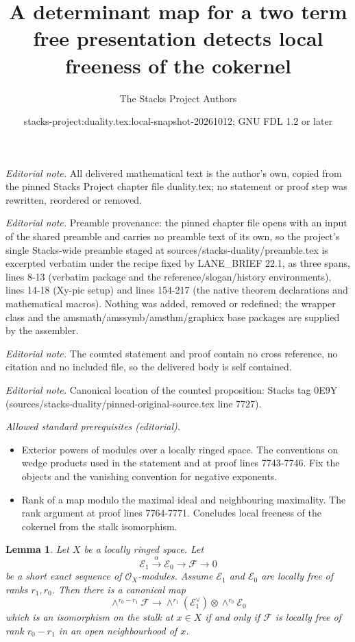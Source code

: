 \documentclass[10pt,a4paper]{amsart}
\title{A determinant map for a two term free presentation detects local freeness of the cokernel}
\author{The Stacks Project Authors}
\date{stacks-project:duality.tex:local-snapshot-20261012; GNU FDL 1.2 or later}
\theoremstyle{plain}
\newtheorem{lemma}[subsection]{Lemma}
\theoremstyle{definition}
\theoremstyle{remark}
\numberwithin{equation}{subsection}
\begin{document}
\maketitle
\noindent\textit{Editorial note.} All delivered mathematical text is the author's own, copied from the pinned Stacks Project chapter file duality.tex; no statement or proof step was rewritten, reordered or removed.\par\medskip
\noindent\textit{Editorial note.} Preamble provenance: the pinned chapter file opens with an input of the shared preamble and carries no preamble text of its own, so the project's single Stacks-wide preamble staged at sources/stacks-duality/preamble.tex is excerpted verbatim under the recipe fixed by LANE\_BRIEF 22.1, as three spans, lines 8-13 (verbatim package and the reference/slogan/history environments), lines 14-18 (Xy-pic setup) and lines 154-217 (the native theorem declarations and mathematical macros). Nothing was added, removed or redefined; the wrapper class and the amsmath/amssymb/amsthm/graphicx base packages are supplied by the assembler.\par\medskip
\noindent\textit{Editorial note.} The counted statement and proof contain no cross reference, no citation and no included file, so the delivered body is self contained.\par\medskip
\noindent\textit{Editorial note.} Canonical location of the counted proposition: Stacks tag 0E9Y (sources/stacks-duality/pinned-original-source.tex line 7727).\par\medskip
\noindent\textit{Allowed standard prerequisites (editorial).}\begin{itemize}
\item Exterior powers of modules over a locally ringed space. The conventions on wedge products used in the statement and at proof lines 7743-7746. Fix the objects and the vanishing convention for negative exponents.
\item Rank of a map modulo the maximal ideal and neighbouring maximality. The rank argument at proof lines 7764-7771. Concludes local freeness of the cokernel from the stalk isomorphism.
\end{itemize}\medskip
\begin{lemma}
\label{lemma-determinant}
Let $X$ be a locally ringed space. Let
$$
\mathcal{E}_1 \xrightarrow{\alpha} \mathcal{E}_0 \to \mathcal{F} \to 0
$$
be a short exact sequence of $\mathcal{O}_X$-modules.
Assume $\mathcal{E}_1$ and $\mathcal{E}_0$ are locally
free of ranks $r_1, r_0$. Then there is a canonical map
$$
\wedge^{r_0 - r_1}\mathcal{F}
\longrightarrow
\wedge^{r_1}(\mathcal{E}_1^\vee) \otimes \wedge^{r_0}\mathcal{E}_0
$$
which is an isomorphism on the stalk at $x \in X$
if and only if $\mathcal{F}$ is locally free of rank $r_0 - r_1$
in an open neighbourhood of $x$.
\end{lemma}
\end{document}
